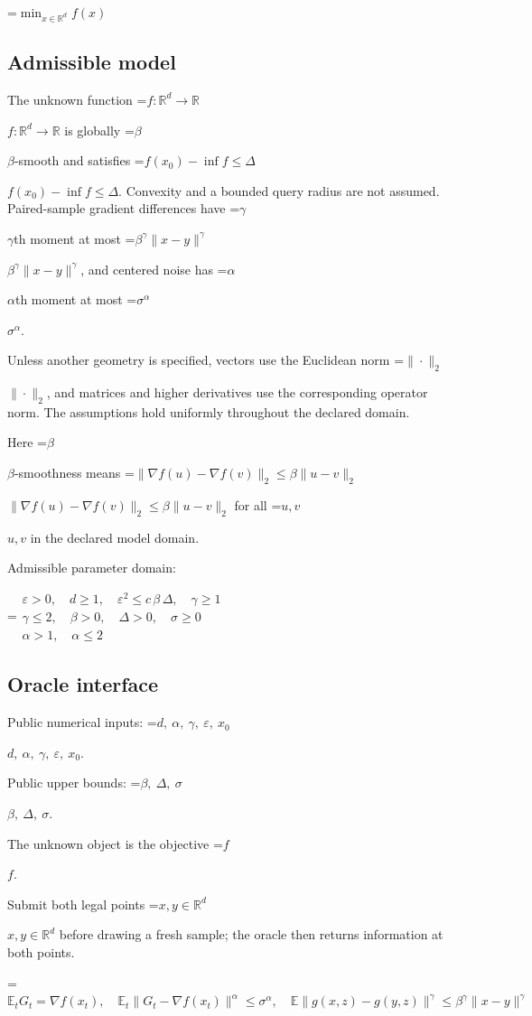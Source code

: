 \documentclass[10pt,a4paper]{article}
\newcommand{\AtlasMath}[1]{\par\begingroup\centering\setbox0=\hbox{$\displaystyle #1$}\ifdim\wd0>1.4\linewidth\typeout{ATLAS WIDE FORMULA: \the\wd0}\fi\ifdim\wd0>\linewidth\resizebox{\linewidth}{!}{\box0}\else\box0\fi\par\endgroup}
\newcommand{\AtlasInlineMath}[1]{\begingroup\setbox0=\hbox{$#1$}\ifdim\wd0>.4\linewidth\endgroup\AtlasMath{#1}\else\endgroup$#1$\fi}
\begin{document}
\AtlasMath{\min_{x\in \mathbb{R}^d}f(x)}


\subsection{Admissible model}
The unknown function \AtlasInlineMath{f:\mathbb R^d\to\mathbb R} is globally \AtlasInlineMath{\beta}-smooth and satisfies \AtlasInlineMath{f(x_0)-\inf f\le\Delta}. Convexity and a bounded query radius are not assumed. Paired-sample gradient differences have \AtlasInlineMath{\gamma}th moment at most \AtlasInlineMath{\beta^\gamma\|x-y\|^\gamma}, and centered noise has \AtlasInlineMath{\alpha}th moment at most \AtlasInlineMath{\sigma^\alpha}.

Unless another geometry is specified, vectors use the Euclidean norm \AtlasInlineMath{\|\cdot\|_2}, and matrices and higher derivatives use the corresponding operator norm. The assumptions hold uniformly throughout the declared domain.

Here \AtlasInlineMath{\beta}-smoothness means \AtlasInlineMath{\|\nabla f(u)-\nabla f(v)\|_2\le\beta\|u-v\|_2} for all \AtlasInlineMath{u,v} in the declared model domain.

Admissible parameter domain:


\AtlasMath{\begin{gathered}\varepsilon > 0,\quad d \ge 1,\quad {\varepsilon}^{2} \le c\,\beta\,\Delta,\quad \gamma \ge 1\\\gamma \le 2,\quad \beta > 0,\quad \Delta > 0,\quad \sigma \ge 0\\\alpha > 1,\quad \alpha \le 2\end{gathered}}


\subsection{Oracle interface}
Public numerical inputs: \AtlasInlineMath{d,\ \alpha,\ \gamma,\ \varepsilon,\ x_0}.

Public upper bounds: \AtlasInlineMath{\beta,\ \Delta,\ \sigma}.

The unknown object is the objective \AtlasInlineMath{f}.

Submit both legal points \AtlasInlineMath{x,y\in\mathbb R^d} before drawing a fresh sample; the oracle then returns information at both points.


\AtlasMath{\mathbb{E}_tG_t=\nabla f(x_t),\quad\mathbb{E}_t\|G_t-\nabla f(x_t)\|^\alpha\le\sigma^\alpha,\quad\mathbb{E}\|g(x,z)-g(y,z)\|^\gamma\le\beta^\gamma\|x-y\|^\gamma}
\end{document}
